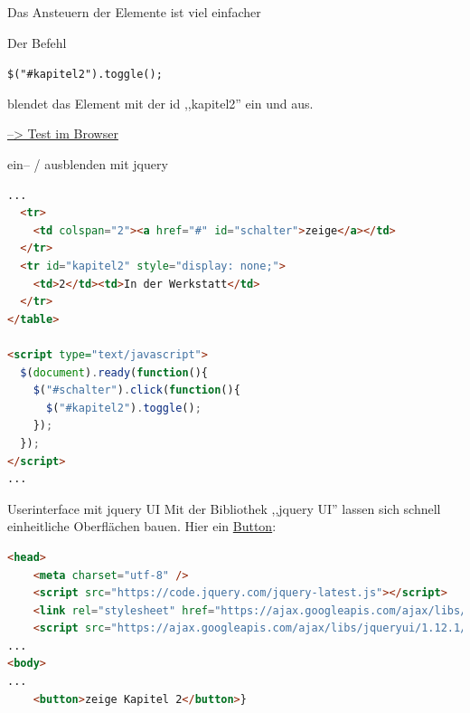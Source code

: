 
\begin{frame}[fragile]{Das Ansteuern der Elemente ist viel einfacher}
  \selectfont

  Der Befehl

  \lstinline{$("#kapitel2").toggle();}

  blendet das Element mit der id ,,kapitel2'' ein und aus.

  \href{./html_und_js/18-javascript-jquery.html}{--> Test im Browser}
\end{frame}

\begin{frame}[fragile]{ein-- / ausblenden mit jquery}
  \selectfont
  \begin{lstlisting}[language=html]
...
  <tr>
    <td colspan="2"><a href="#" id="schalter">zeige</a></td>
  </tr>
  <tr id="kapitel2" style="display: none;">
    <td>2</td><td>In der Werkstatt</td>
  </tr>
</table>

<script type="text/javascript">
  $(document).ready(function(){
    $("#schalter").click(function(){
      $("#kapitel2").toggle();
    });
  });
</script>
...
  \end{lstlisting}
\end{frame}

\begin{frame}[fragile]{Userinterface mit jquery UI}
  \selectfont
  Mit der Bibliothek ,,jquery UI'' lassen sich schnell einheitliche Oberflächen bauen. 
  Hier ein \href{./html_und_js/19-javascript-jqueryui.html}{Button}:
  \begin{lstlisting}[language=html]
<head>
    <meta charset="utf-8" />
    <script src="https://code.jquery.com/jquery-latest.js"></script>
    <link rel="stylesheet" href="https://ajax.googleapis.com/ajax/libs/jqueryui/1.12.1/themes/smoothness/jquery-ui.css">
    <script src="https://ajax.googleapis.com/ajax/libs/jqueryui/1.12.1/jquery-ui.min.js"></script>
...
<body>
...
    <button>zeige Kapitel 2</button>}
  \end{lstlisting}
\end{frame}

